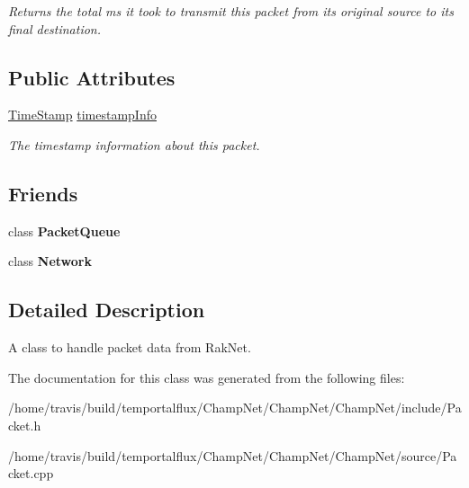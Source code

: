 \begin{DoxyCompactItemize}
\begin{DoxyCompactList}\small\item\em Returns the total ms it took to transmit this packet from its original source to its final destination. \end{DoxyCompactList}\end{DoxyCompactItemize}
\subsection*{Public Attributes}
\begin{DoxyCompactItemize}
\item 
\hypertarget{class_champ_net_1_1_packet_a0fcefd5ba56854e5a8e3e63a51e3963e}{\hyperlink{struct_champ_net_1_1_time_stamp}{Time\-Stamp} \hyperlink{class_champ_net_1_1_packet_a0fcefd5ba56854e5a8e3e63a51e3963e}{timestamp\-Info}}\label{class_champ_net_1_1_packet_a0fcefd5ba56854e5a8e3e63a51e3963e}

\begin{DoxyCompactList}\small\item\em The timestamp information about this packet. \end{DoxyCompactList}\end{DoxyCompactItemize}
\subsection*{Friends}
\begin{DoxyCompactItemize}
\item 
\hypertarget{class_champ_net_1_1_packet_ac3f1afb9cc164b535c73e6f5909519ff}{class {\bfseries Packet\-Queue}}\label{class_champ_net_1_1_packet_ac3f1afb9cc164b535c73e6f5909519ff}

\item 
\hypertarget{class_champ_net_1_1_packet_a88b59289ffd793fecd040d32e397b1e9}{class {\bfseries Network}}\label{class_champ_net_1_1_packet_a88b59289ffd793fecd040d32e397b1e9}

\end{DoxyCompactItemize}


\subsection{Detailed Description}
A class to handle packet data from Rak\-Net. 

The documentation for this class was generated from the following files\-:\begin{DoxyCompactItemize}
\item 
/home/travis/build/temportalflux/\-Champ\-Net/\-Champ\-Net/\-Champ\-Net/include/Packet.\-h\item 
/home/travis/build/temportalflux/\-Champ\-Net/\-Champ\-Net/\-Champ\-Net/source/Packet.\-cpp\end{DoxyCompactItemize}
